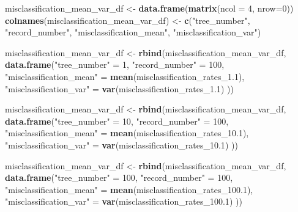 \documentclass[
]{article}
\newenvironment{Shaded}{\begin{snugshade}}{\end{snugshade}}
\newcommand{\AttributeTok}[1]{\textcolor[rgb]{0.13,0.29,0.53}{#1}}
\newcommand{\DecValTok}[1]{\textcolor[rgb]{0.00,0.00,0.81}{#1}}
\newcommand{\FloatTok}[1]{\textcolor[rgb]{0.00,0.00,0.81}{#1}}
\newcommand{\FunctionTok}[1]{\textcolor[rgb]{0.13,0.29,0.53}{\textbf{#1}}}
\newcommand{\NormalTok}[1]{#1}
\newcommand{\OtherTok}[1]{\textcolor[rgb]{0.56,0.35,0.01}{#1}}
\newcommand{\StringTok}[1]{\textcolor[rgb]{0.31,0.60,0.02}{#1}}
\begin{document}
\begin{Shaded}
\begin{Highlighting}[]
\NormalTok{misclassification\_mean\_var\_df }\OtherTok{\textless{}{-}} \FunctionTok{data.frame}\NormalTok{(}\FunctionTok{matrix}\NormalTok{(}\AttributeTok{ncol =} \DecValTok{4}\NormalTok{, }\AttributeTok{nrow=}\DecValTok{0}\NormalTok{))}
\FunctionTok{colnames}\NormalTok{(misclassification\_mean\_var\_df) }\OtherTok{\textless{}{-}} \FunctionTok{c}\NormalTok{(}\StringTok{"tree\_number"}\NormalTok{, }\StringTok{"record\_number"}\NormalTok{, }\StringTok{"misclassification\_mean"}\NormalTok{, }\StringTok{"misclassification\_var"}\NormalTok{) }

\NormalTok{misclassification\_mean\_var\_df }\OtherTok{\textless{}{-}} \FunctionTok{rbind}\NormalTok{(misclassification\_mean\_var\_df, }
                                      \FunctionTok{data.frame}\NormalTok{(}\StringTok{"tree\_number"} \OtherTok{=} \DecValTok{1}\NormalTok{, }
                                                 \StringTok{"record\_number"} \OtherTok{=} \DecValTok{100}\NormalTok{,}
                                                 \StringTok{"misclassification\_mean"} \OtherTok{=} \FunctionTok{mean}\NormalTok{(misclassification\_rates\_1}\FloatTok{.1}\NormalTok{),}
                                                 \StringTok{"misclassification\_var"} \OtherTok{=} \FunctionTok{var}\NormalTok{(misclassification\_rates\_1}\FloatTok{.1}\NormalTok{)}
\NormalTok{                                                 ))}

\NormalTok{misclassification\_mean\_var\_df }\OtherTok{\textless{}{-}} \FunctionTok{rbind}\NormalTok{(misclassification\_mean\_var\_df, }
                                      \FunctionTok{data.frame}\NormalTok{(}\StringTok{"tree\_number"} \OtherTok{=} \DecValTok{10}\NormalTok{, }
                                                 \StringTok{"record\_number"} \OtherTok{=} \DecValTok{100}\NormalTok{,}
                                                 \StringTok{"misclassification\_mean"} \OtherTok{=} \FunctionTok{mean}\NormalTok{(misclassification\_rates\_10}\FloatTok{.1}\NormalTok{),}
                                                 \StringTok{"misclassification\_var"} \OtherTok{=} \FunctionTok{var}\NormalTok{(misclassification\_rates\_10}\FloatTok{.1}\NormalTok{)}
\NormalTok{                                                 ))}

\NormalTok{misclassification\_mean\_var\_df }\OtherTok{\textless{}{-}} \FunctionTok{rbind}\NormalTok{(misclassification\_mean\_var\_df, }
                                      \FunctionTok{data.frame}\NormalTok{(}\StringTok{"tree\_number"} \OtherTok{=} \DecValTok{100}\NormalTok{, }
                                                 \StringTok{"record\_number"} \OtherTok{=} \DecValTok{100}\NormalTok{,}
                                                 \StringTok{"misclassification\_mean"} \OtherTok{=} \FunctionTok{mean}\NormalTok{(misclassification\_rates\_100}\FloatTok{.1}\NormalTok{),}
                                                 \StringTok{"misclassification\_var"} \OtherTok{=} \FunctionTok{var}\NormalTok{(misclassification\_rates\_100}\FloatTok{.1}\NormalTok{)}
\NormalTok{                                                 ))}


\end{Highlighting}
\end{Shaded}
\end{document}
